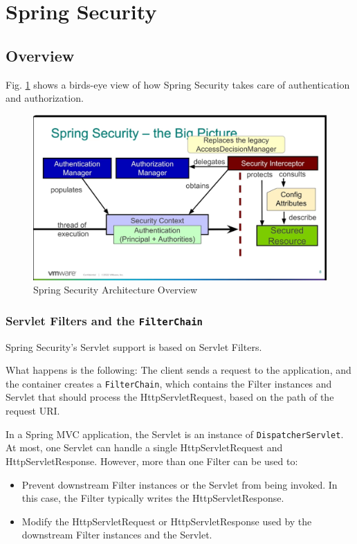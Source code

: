 \documentclass{scrartcl}
\begin{document}
\section{Spring Security}
\subsection{Overview}

Fig. \ref*{fig:spring-security} shows a birds-eye view of how Spring Security takes care of authentication and authorization.

\begin{figure}[h!]
    \centering
    \includegraphics[width=1\linewidth]{spring-security}
    \caption{Spring Security Architecture Overview}
    \label{fig:spring-security}
\end{figure}

\subsubsection{Servlet Filters and the \lstinline|FilterChain|}

Spring Security’s Servlet support is based on Servlet Filters.

What happens is the following: The client sends a request to the application, and the container creates a \lstinline|FilterChain|, which contains the Filter instances and Servlet that should process the HttpServletRequest, based on the path of the request URI.

In a Spring MVC application, the Servlet is an instance of \lstinline|DispatcherServlet|. At most, one Servlet can handle a single HttpServletRequest and HttpServletResponse. However, more than one Filter can be used to:

\begin{itemize}
    \item Prevent downstream Filter instances or the Servlet from being invoked. In this case, the Filter typically writes the HttpServletResponse.
    \item Modify the HttpServletRequest or HttpServletResponse used by the downstream Filter instances and the Servlet.
\end{itemize}
\end{document}
